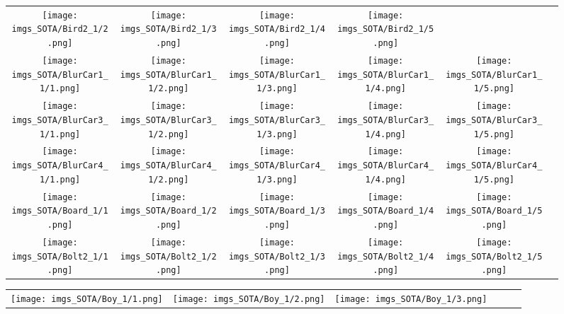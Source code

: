\begin{figure}[H]
\begin{tabular}{@{}c@{}c@{}c@{}c@{}c@{}c@{}}
\texttt{[image: imgs\_SOTA/Bird2\_1/2.png]}&
\texttt{[image: imgs\_SOTA/Bird2\_1/3.png]}&
\texttt{[image: imgs\_SOTA/Bird2\_1/4.png]}&
\texttt{[image: imgs\_SOTA/Bird2\_1/5.png]}&
\\
\texttt{[image: imgs\_SOTA/BlurCar1\_1/1.png]}&
\texttt{[image: imgs\_SOTA/BlurCar1\_1/2.png]}&
\texttt{[image: imgs\_SOTA/BlurCar1\_1/3.png]}&
\texttt{[image: imgs\_SOTA/BlurCar1\_1/4.png]}&
\texttt{[image: imgs\_SOTA/BlurCar1\_1/5.png]}&
\\
\texttt{[image: imgs\_SOTA/BlurCar3\_1/1.png]}&
\texttt{[image: imgs\_SOTA/BlurCar3\_1/2.png]}&
\texttt{[image: imgs\_SOTA/BlurCar3\_1/3.png]}&
\texttt{[image: imgs\_SOTA/BlurCar3\_1/4.png]}&
\texttt{[image: imgs\_SOTA/BlurCar3\_1/5.png]}&
\\
\texttt{[image: imgs\_SOTA/BlurCar4\_1/1.png]}&
\texttt{[image: imgs\_SOTA/BlurCar4\_1/2.png]}&
\texttt{[image: imgs\_SOTA/BlurCar4\_1/3.png]}&
\texttt{[image: imgs\_SOTA/BlurCar4\_1/4.png]}&
\texttt{[image: imgs\_SOTA/BlurCar4\_1/5.png]}&
\\
\texttt{[image: imgs\_SOTA/Board\_1/1.png]}&
\texttt{[image: imgs\_SOTA/Board\_1/2.png]}&
\texttt{[image: imgs\_SOTA/Board\_1/3.png]}&
\texttt{[image: imgs\_SOTA/Board\_1/4.png]}&
\texttt{[image: imgs\_SOTA/Board\_1/5.png]}&
\\
\texttt{[image: imgs\_SOTA/Bolt2\_1/1.png]}&
\texttt{[image: imgs\_SOTA/Bolt2\_1/2.png]}&
\texttt{[image: imgs\_SOTA/Bolt2\_1/3.png]}&
\texttt{[image: imgs\_SOTA/Bolt2\_1/4.png]}&
\texttt{[image: imgs\_SOTA/Bolt2\_1/5.png]}&
\\
\end{tabular}\end{figure}\begin{figure}[H]
\setlength{\tabcolsep}{6pt}
\renewcommand{\arraystretch}{0}
\begin{tabular}{@{}c@{}c@{}c@{}c@{}c@{}c@{}}\texttt{[image: imgs\_SOTA/Boy\_1/1.png]}&
\texttt{[image: imgs\_SOTA/Boy\_1/2.png]}&
\texttt{[image: imgs\_SOTA/Boy\_1/3.png]}&

\end{tabular}
\end{figure}
